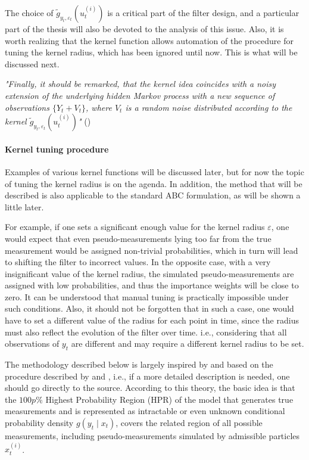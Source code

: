 The choice of \(\tilde{g}_{y_t, \varepsilon_t}\left(u_t^{(i)}\right)\) is a critical part of the filter design, and a particular part of the thesis will also be devoted to the analysis of this issue. Also, it is worth realizing that the kernel function allows automation of the procedure for tuning the kernel radius, which has been ignored until now. This is what will be discussed next.

{\em
"Finally, it should be remarked, that the kernel idea coincides with a noisy extension of the
underlying hidden Markov process with a new sequence of observations \(\{Y_t + V_t\}\), where
\(V_t\) is a random noise distributed according to the kernel \(\tilde{g}_{y_t, \varepsilon_t}\left(u_t^{(i)}\right)\)"
} (\cite{dedecius_adaptive_2017})

\paragraph*{Kernel tuning procedure} Examples of various kernel functions will be discussed later, but for now the topic of tuning the kernel radius is on the agenda. In addition, the method that will be described is also applicable to the standard ABC formulation, as will be shown a little later.

For example, if one sets a significant enough value for the kernel radius \(\varepsilon\), one would expect that even pseudo-measurements lying too far from the true measurement would be assigned non-trivial probabilities, which in turn will lead to shifting the filter to incorrect values. In the opposite case, with a very insignificant value of the kernel radius, the simulated pseudo-measurements are assigned with low probabilities, and thus the importance weights will be close to zero. It can be understood that manual tuning is practically impossible under such conditions. Also, it should not be forgotten that in such a case, one would have to set a different value of the radius for each point in time, since the radius must also reflect the evolution of the filter over time. i.e., considering that all observations of \(y_t\) are different and may require a different kernel radius to be set.

The methodology described below is largely inspired by and based on the procedure described by
\cite{dedecius_adaptive_2017} and \cite{dedecius_marginalized_2018}, i.e., if a more detailed description is needed, one should go directly to the source. According to this theory, the basic idea is that the \( 100p\% \) Highest Probability Region (HPR) of the model that generates true measurements and is represented as intractable or even unknown conditional probability density \(g\left(y_t \mid x_t\right)\), covers the related region of all possible measurements, including pseudo-measurements simulated by admissible particles \(x_t^{(i)}\).

